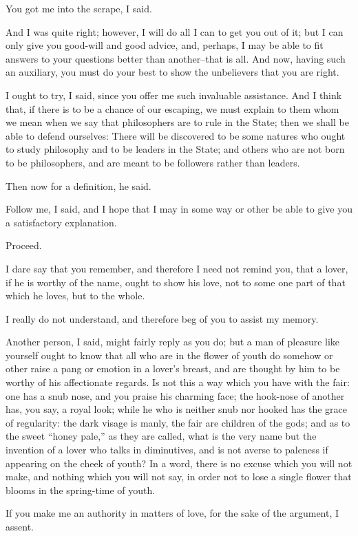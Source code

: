 You got me into the scrape, I said.

And I was quite right; however, I will do all I can to get you out of
it; but I can only give you good-will and good advice, and, perhaps, I
may be able to fit answers to your questions better than another--that
is all. And now, having such an auxiliary, you must do your best to show
the unbelievers that you are right.

I ought to try, I said, since you offer me such invaluable assistance.
And I think that, if there is to be a chance of our escaping, we must
explain to them whom we mean when we say that philosophers are to rule
in the State; then we shall be able to defend ourselves: There will be
discovered to be some natures who ought to study philosophy and to be
leaders in the State; and others who are not born to be philosophers,
and are meant to be followers rather than leaders.

Then now for a definition, he said.

Follow me, I said, and I hope that I may in some way or other be able to
give you a satisfactory explanation.

Proceed.

I dare say that you remember, and therefore I need not remind you, that
a lover, if he is worthy of the name, ought to show his love, not to
some one part of that which he loves, but to the whole.

I really do not understand, and therefore beg of you to assist my
memory.

Another person, I said, might fairly reply as you do; but a man of
pleasure like yourself ought to know that all who are in the flower of
youth do somehow or other raise a pang or emotion in a lover's breast,
and are thought by him to be worthy of his affectionate regards. Is not
this a way which you have with the fair: one has a snub nose, and you
praise his charming face; the hook-nose of another has, you say, a
royal look; while he who is neither snub nor hooked has the grace of
regularity: the dark visage is manly, the fair are children of the gods;
and as to the sweet ``honey pale,'' as they are called, what is the very
name but the invention of a lover who talks in diminutives, and is not
averse to paleness if appearing on the cheek of youth? In a word, there
is no excuse which you will not make, and nothing which you will not
say, in order not to lose a single flower that blooms in the spring-time
of youth.

If you make me an authority in matters of love, for the sake of the
argument, I assent.

